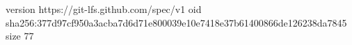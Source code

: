version https://git-lfs.github.com/spec/v1
oid sha256:377d97cf950a3acba7d6d71e800039e10e7418e37b61400866de126238da7845
size 77
